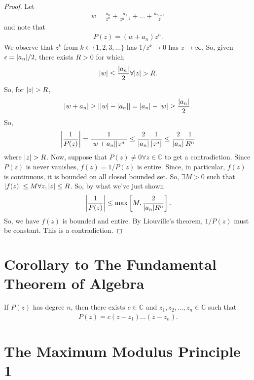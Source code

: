 \documentclass{article}
\theoremstyle{definition}
\newcommand{\f}[2]{\frac{#1}{#2}}
\newcommand{\C}{\mathbb{C}}
\newcommand{\lb}{\left[}
\newcommand{\rb}{\right]}
\begin{document}
\begin{proof}
	Let 
	\begin{align}
	w = \f{a_0}{z^n} + \f{a_1}{z^{n-1}} + \dots + \f{a_{n-1}}{z}
	\end{align}
	and note that
	\begin{align}
	P(z) = (w+ a_n)z^n.
	\end{align}
	We observe that $z^k$ from $k \in \{1,2,3,\dots\}$ has $1/z^k \to 0$ has $z\to \infty$. So, given $\epsilon = \abs{a_n}/2$, there exists $R > 0$ for which
	\begin{align}
	\abs{w} \leq \f{\abs{a_n}}{2} \forall \abs{z} > R.
	\end{align}
	So, for $\abs{z} > R$, 
	\begin{align}
	\abs{w+a_n} \geq \abs{\abs{w} - \abs{a_n}} = \abs{a_n}- \abs{w} \geq \f{\abs{a_n}}{2}.
	\end{align}
	So, 
	\begin{align}
	\abs{\f{1}{P(z)}} = \f{1}{\abs{w+a_n}\abs{z^n}} \leq \f{2}{\abs{a_n}}\f{1}{\abs{z^n}} \leq \f{2}{\abs{a_n}}\f{1}{R^n}
	\end{align}
	where $\abs{z} >R$. Now, suppose that $P(z) \neq 0 \forall z \in \C$ to get a contradiction. Since $P(z)$ is never vanishes, $f(z) = 1/P(z)$ is entire. Since, in particular, $f(z)$ is continuous, it is bounded on all closed bounded set. So, $\exists M > 0$ such that $\abs{f(z)} \leq M \forall z, \abs{z} \leq R$. So, by what we've just shown
	\begin{align}
	\abs{\f{1}{P(z)}} \leq \max\lb M, \f{2}{\abs{a_n} R^n} \rb.
	\end{align} 
	So, we have $f(z)$ is bounded and entire. By Liouville's theorem, $1/P(z)$ must be constant. This is a contradiction. 
\end{proof}





\section{Corollary to The Fundamental Theorem of Algebra}

If $P(z)$ has degree $n$, then there exists $c \in \C$ and $z_1, z_2, \dots, z_n \in \C$ such that
\begin{align}
P(z) = c(z-z_1)\dots (z - z_n).
\end{align}



\section{The Maximum Modulus Principle 1}
\end{document}
